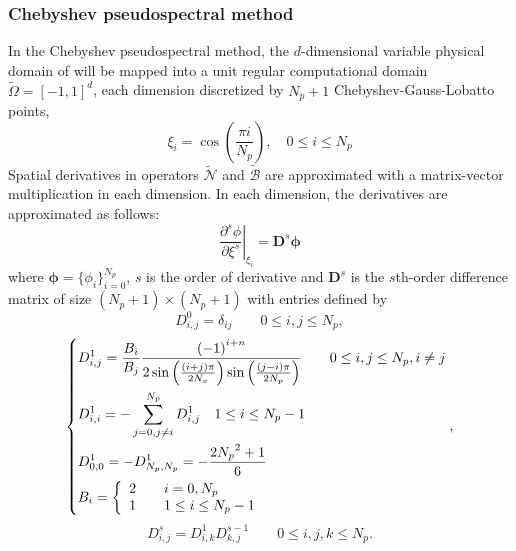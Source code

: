 \documentclass[preprint, 10pt]{elsarticle}
\begin{document}
\subsubsection{Chebyshev pseudospectral method}
In the Chebyshev pseudospectral method, the $d$-dimensional variable physical domain of  will be mapped into a unit regular computational domain $\widetilde \Omega =[-1,1]^d$,  each dimension discretized by  $N_p+1$ Chebyshev-Gauss-Lobatto points,
\begin{equation}
\xi_i=\cos \left( \frac{\pi i}{N_p} \right), \quad 0 \le i \le {N_p}
\label{eq_CollocationPoints}
\end{equation}
Spatial derivatives in operators $\widetilde {\mathcal{N}}$ and $\widetilde {\mathcal{B}}$ are approximated with a matrix-vector multiplication in each dimension. In each dimension, the derivatives are approximated as follows:
\begin{equation}
\left. { \frac{\partial^s    \phi}{{\partial \xi^s}  }} \right|_{\xi _i }
 = \mathbf{D}^s \pmb{\phi}
\end{equation}
where $\pmb{\phi}=\{\phi _i\}_{i=0}^{N_p}$, $s$ is the order of derivative and $\mathbf{D}^s$ is the $s$th-order difference matrix of size ${(N_p+1)\times (N_p+1)}$ with entries defined by
\begin{equation}
D^0_{i,j} = \delta_{ij} \qquad 0 \le i,j \le {N_p},
\label{eq_D0}
\end{equation}
\begin{equation}
\left\{ \begin{aligned}
&D_{i,j}^1 = \frac{{{B_i}}}{{{B_j}}}\frac{{{{( - 1)}^{i + n}}}}{{2\sin \left( {\frac{{(i + j)\pi }}{{2{N_x}}}} \right)\sin \left( {\frac{{(j - i)\pi }}{{2{N_p}}}} \right)}} \qquad 0 \le i,j \le {N_p},i \ne j\\
&D_{i,i}^1 =  - \sum\limits_{j = 0,j \ne i}^{{N_p}} {D_{i,j}^1} \quad 1 \le i \le {N_p} - 1\\
&D_{0,0}^1 =  - D_{{N_p},{N_p}}^1 =  - \frac{{2{N_p}^2 + 1}}{6}{\rm{                       }}\\
&{B_i} = \left\{
                 \begin{array}{*{20}{l}}
                      2 \qquad i=0, N_p \\
                      1 \qquad 1 \le i \le {N_p-1}
                 \end{array}
                 \right.
\end{aligned} \right. ,
\label{eq_D1}
\end{equation}
\begin{equation}
D^s_{i,j} = D^{1}_{i,k}D^{s-1}_{k,j} \qquad 0 \le i,j,k \le {N_p}.
\label{eq_Ds}
\end{equation}
\end{document}
